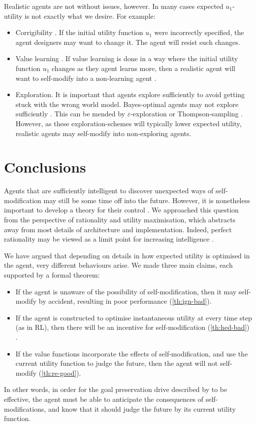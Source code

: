 \documentclass[a4paper]{article}
\theoremstyle{definition}
\theoremstyle{remark}
\begin{document}
Realistic agents are not without issues, however.
In many cases expected $u_1$-utility is not exactly what we desire.
For example:
\begin{itemize}
\item Corrigibility \citep{Soares2015cor}.
  If the initial utility function $u_1$ were incorrectly
  specified, the agent designers may want to change it.
  The agent will resist such changes.
\item Value learning \citep{Dewey2011}. If value learning is done in a way
  where the initial utility function $u_1$ changes as they
  agent learns more,
  then a realistic agent will want to self-modify into a non-learning
  agent \citep{Soares2015vl}.
\item Exploration. It is important that agents explore sufficiently to avoid
  getting stuck with the wrong world model.
  Bayes-optimal agents may not explore sufficiently \citep{Leike2015}.
  This can be mended by  $\varepsilon$-exploration \citep{Sutton1998}
  or Thompson-sampling \citep{Leike2016}.
  However, as these exploration-schemes will typically lower expected utility,
  realistic agents may self-modify into non-exploring agents.
\end{itemize}

\section{Conclusions}
\label{sec:conclusions}

Agents that are sufficiently intelligent to discover unexpected
ways of self-modification
may still be some time off into the future.
However, it is nonetheless important
to develop a theory for their control \citep{Bostrom2014}.
We approached this question from the perspective
of rationality and utility maximisation,
which abstracts away from most details of
architecture and implementation.
Indeed, perfect rationality may be viewed as a limit point for
increasing intelligence \citep{Legg2007,Omohundro2008}.

We have argued that depending on details in how expected utility is optimised in
the agent, very different behaviours arise.
We made three main claims, each supported by a formal theorem:
\begin{itemize}
\item If the agent is unaware of the possibility of self-modification,
  then it may self-modify by accident, resulting in poor performance (\cref{th:ign-bad}).
\item If the agent is constructed to optimise instantaneous utility
  at every time step (as in RL),
  then there will be an incentive for self-modification
  (\cref{th:hed-bad}) .
\item If the value functions incorporate the effects
  of self-modification, and use the current utility function to
  judge the future,
  then the agent will not self-modify (\cref{th:re-good}).
\end{itemize}
In other words, in order for the goal preservation drive
described by \citet{Omohundro2008} to be effective,
the agent must be able to anticipate the consequences of
self-modifications, and know that it should judge the future
by its current utility function.
\end{document}
